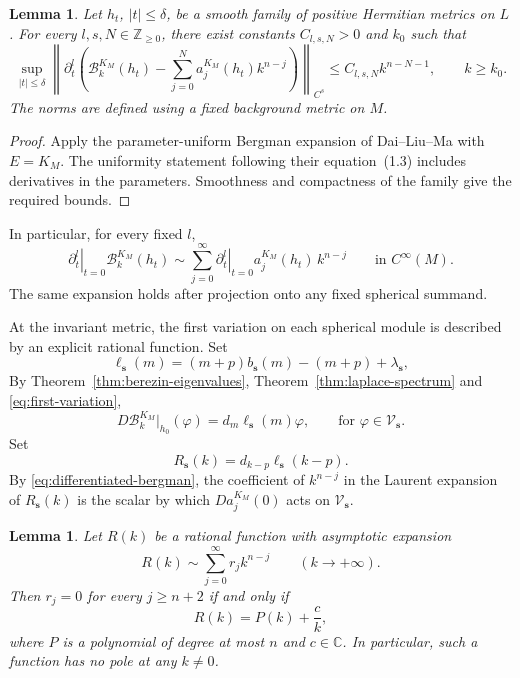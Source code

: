\documentclass[11pt,reqno]{amsart}
\newtheorem{lemma}[theorem]{Lemma}
\theoremstyle{corollary}
\theoremstyle{conjecture}
\theoremstyle{assumption}
\theoremstyle{proposition}
\theoremstyle{remark}
\numberwithin{equation}{section}
\newcommand{\pa}{\partial}
\begin{document}
\begin{lemma}
\label{lem:parameter-bergman}
Let $h_t$, $|t|\leq\delta$, be a smooth family of positive Hermitian metrics on $L$. For every $l,s,N\in\mathbb Z_{\geq 0}$, there exist constants $C_{l,s,N}>0$ and $k_0$ such that
\[
\sup_{|t|\leq\delta}\left\|\pa_t^l\left(\mathcal B_k^{K_M}(h_t)-\sum_{j=0}^{N}a^{K_M}_j(h_t)k^{n-j}\right)\right\|_{C^s}\leq C_{l,s,N}k^{n-N-1},\qquad k\geq k_0.
\]
The norms are defined using a fixed background metric on $M$.
\end{lemma}
\begin{proof}
Apply the parameter-uniform Bergman expansion of Dai--Liu--Ma \cite[Theorems~1.1 and~1.3]{DaiLiuMa2006} with $E=K_M$. The uniformity statement following their equation~(1.3) includes derivatives in the parameters. Smoothness and
compactness of the family give the required bounds.
\end{proof}

In particular, for every fixed $l$,
\begin{equation}\label{eq:differentiated-bergman}
\left.\pa_t^l\right|_{t=0}\mathcal B_k^{K_M}(h_t)\sim\sum_{j=0}^{\infty}\left.\pa_t^l\right|_{t=0}a^{K_M}_j(h_t)\,k^{n-j}\qquad\text{in }C^\infty(M).
\end{equation}
The same expansion holds after projection onto any fixed spherical summand. 

At the invariant metric, the first variation on each spherical module is described by an explicit rational function. Set
\[
\ell_{\mathbf s}(m)=(m+p)b_{\mathbf s}(m)-(m+p)+\lambda_{\mathbf s},
\]
By Theorem~\ref{thm:berezin-eigenvalues}, Theorem~\ref{thm:laplace-spectrum} and \eqref{eq:first-variation},
\begin{equation}\label{eq:spherical-scalar}
D\mathcal B_k^{K_M}|_{h_0}(\varphi)=d_m\ell_{\mathbf s}(m)\varphi,\qquad\text{for }\varphi\in\mathcal V_{\mathbf s}.
\end{equation}
Set
\[
R_{\mathbf s}(k)=d_{k-p}\ell_{\mathbf s}(k-p).
\]
By \eqref{eq:differentiated-bergman}, the coefficient of $k^{n-j}$ in the Laurent expansion of $R_{\mathbf s}(k)$ is the scalar by which $Da^{K_M}_j(0)$ acts on $\mathcal V_{\mathbf s}$.

\begin{lemma}\label{lem:rational-pole-principle}
Let $R(k)$ be a rational function with asymptotic expansion
\[
R(k)\sim\sum_{j=0}^{\infty}r_jk^{n-j}\qquad (k\to+\infty).
\]
Then $r_j=0$ for every $j\geq n+2$ if and only if
\begin{equation}\label{eq:rational-pole-principle}
R(k)=P(k)+\frac{c}{k},
\end{equation}
where $P$ is a polynomial of degree at most $n$ and $c\in\mathbb C$. In particular, such a function has no pole at any $k\neq 0$.
\end{lemma}
\end{document}
